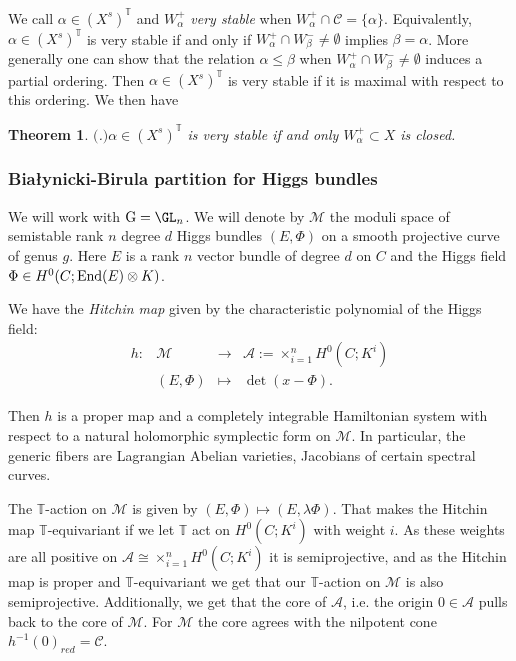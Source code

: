\documentclass[12pt]{article}
\numberwithin{equation}{section}
\newtheorem{theorem}{Theorem}
\theoremstyle{remark}
\numberwithin{theorem}{section}
\def\M{{\mathcal{M}}}
\def\calA{{\mathcal{A}}}
\newcommand{\T}{{\mathbb{T}}}
\def\calC{{\mathcal C}}
\newcommand{\End}{\textnormal{End}}
\newcommand{\G}{\mathrm{G}}
\numberwithin{equation}{section}
\begin{document}
We call $\alpha\in (X^s)^\T$ and $W^+_\alpha$ {\em very stable} when $W^+_\alpha\cap \calC =\{\alpha\}$. Equivalently, $\alpha\in (X^s)^\T$ is very stable if and only if $W^+_\alpha\cap W_\beta^-\neq \emptyset $ implies $\beta=\alpha$. More generally one can show that the relation $\alpha\leq \beta$ when $W^+_\alpha\cap W_\beta^-\neq \emptyset$ induces a partial ordering. Then $\alpha\in (X^s)^\T$  is very stable if it is maximal with respect to this ordering. We then have

\begin{theorem}$\!\!($\cite[Proposition 2.14]{hausel-hitchin}.$)$\label{closed} $\alpha\in (X^s)^\T$ is very stable if and only $W_\alpha^+\subset X$ is closed. 
\end{theorem}




\subsubsection{Białynicki-Birula partition for  Higgs bundles} 

We will work with $\G=\GL_n$. We will denote by $\M$ the moduli space of semistable rank $n$ degree $d$ Higgs bundles $(E,\Phi)$ on a smooth projective curve of genus $g$. Here $E$ is a rank $n$ vector bundle of degree $d$ on $C$ and the Higgs field $\Phi\in H^0(C;\End(E)\otimes K)$. 

We have the {\em Hitchin map} \cite{hitchin-stable} given by the characteristic polynomial of the Higgs field: $$\begin{array}{cccc} h: &\M&\to& \calA:=\times_{i=1}^n H^0(C;K^i)\\ &(E,\Phi)&\mapsto& \det(x-\Phi).\end{array}$$ 

Then $h$ is a proper map \cite{hitchin,nitsure,simpson} and a completely integrable Hamiltonian system \cite{hitchin-stable,faltings} with respect to a natural holomorphic symplectic form on $\M$. In particular, the generic fibers are Lagrangian Abelian varieties, Jacobians of certain spectral curves. 

The $\T$-action on $\M$ is given by $(E,\Phi)\mapsto (E,\lambda\Phi)$. That makes the Hitchin map $\T$-equivariant if we let $\T$ act on $H^0(C;K^i)$ with weight $i$. As these weights are all positive on $\calA\cong \times_{i=1}^n H^0(C;K^i)$ it is semiprojective, and as the Hitchin map is proper and $\T$-equivariant we get that our $\T$-action on $\M$  is also  semiprojective. Additionally, we get that the core of $\calA$, i.e. the origin $0\in \calA$ pulls back to the core of $\M$. For $\M$ the core agrees with the nilpotent cone $h^{-1}(0)_{red}=\calC$. 
\end{document}
